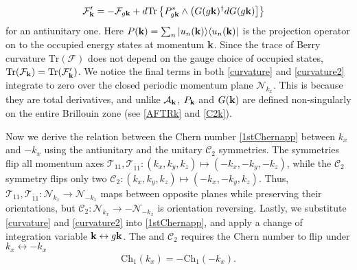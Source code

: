 \begin{align}
\mathcal{F}'_{\bf k}&=-\mathcal{F}_{g{\bf k}}+d\mathrm{Tr}\left\{P_{g\bf{k}}^\ast\wedge\left(G(g{\bf k})^\dagger dG(g{\bf k})\right]\right\}\label{curvature2}\end{align} for an antiunitary one. Here $P({\bf k})=\sum_n|u_n({\bf k})\rangle\langle u_n({\bf k})|$ is the projection operator on to the occupied energy states at momentum ${\bf k}$. Since the trace of Berry curvature $\mathrm{Tr}(\mathcal{F})$ does not depend on the gauge choice of occupied states, $\mathrm{Tr}(\mathcal{F}_{\bf k})=\mathrm{Tr}(\mathcal{F}'_{\bf k})$. We notice the final terms in both \eqref{curvature} and \eqref{curvature2} integrate to zero over the closed periodic momentum plane $\mathcal{N}_{k_x}$. This is because they are total derivatives, and unlike $\mathcal{A}_{\bf k}$, $P_{\bf k}$ and $G({\bf k})$ are defined non-singularly on the entire Brillouin zone (see \eqref{AFTRk} and \eqref{C2k}). 

Now we derive the relation between the Chern number \eqref{1stChernapp} between $k_x$ and $-k_x$ using the antiunitary \AFTR and the unitary $\mathcal{C}_2$ symmetries. The \AFTR symmetries flip all momentum axes $\mathcal{T}_{11},\mathcal{T}_{\bar{1}1}:(k_x,k_y,k_z)\mapsto(-k_x,-k_y,-k_z)$, while the $\mathcal{C}_2$ symmetry flips only two $\mathcal{C}_2:(k_x,k_y,k_z)\mapsto(-k_x,-k_y,k_z)$. Thus, $\mathcal{T}_{11},\mathcal{T}_{\bar{1}1}:\mathcal{N}_{k_x}\to\mathcal{N}_{-k_x}$ maps between opposite planes while preserving their orientations, but $\mathcal{C}_2:\mathcal{N}_{k_x}\to-\mathcal{N}_{-k_x}$ is orientation reversing. Lastly, we substitute \eqref{curvature} and \eqref{curvature2} into \eqref{1stChernapp}, and apply a change of integration variable ${\bf k}\leftrightarrow g{\bf k}$. The \AFTR and $\mathcal{C}_2$ requires the Chern number to flip under $k_x\leftrightarrow-k_x$ \begin{align}\mathrm{Ch}_1(k_x)=-\mathrm{Ch}_1(-k_x).\end{align}


